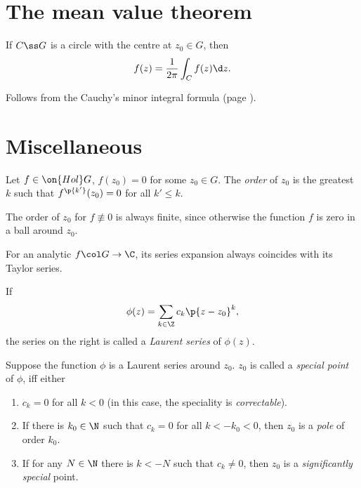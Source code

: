 \documentclass[a4paper, 12pt]{article}
\newcommand{\Hol}[0]{\on{Hol}}
\begin{document}
\section{The mean value theorem}

\begin{lemma}
  If $C \ss G$ is a circle with the centre at $z_0 \in G$, then
  $$ f(z) = \frac{1}{2 \pi} \int_{C} f(z) \d z. $$
\end{lemma}

\begin{idea}
  Follows from the Cauchy's minor integral formula (page \pageref{Cauchy, minor integral formula}).
\end{idea}

\section{Miscellaneous}

\begin{definition}
  Let $f \in \Hol G$, $f(z_0) = 0$ for some $z_0 \in G$. The \emph{order} of $z_0$ is the greatest $k$ such that $f^{\p{k'}}(z_0) = 0$ for all $k' \le k$.
\end{definition}
The order of $z_0$ for $f \not \equiv 0$ is always finite, since otherwise the function $f$ is zero in a ball around $z_0$.

\begin{lemma}
  For an analytic $f \col G \to \C$, its series expansion always coincides with its Taylor series.
\end{lemma}

\begin{definition}
  If
  $$ \phi(z) = \sum_{k \in \Z} c_k \p{z-z_0}^k, $$
  the series on the right is called a \emph{Laurent series} of $\phi(z)$.
\end{definition}

\begin{definition}
    Suppose the function $\phi$ is a Laurent series around $z_0$.
    $z_0$ is called a \emph{special point} of $\phi$, iff either
  \begin{enumerate}
    \item $c_k = 0$ for all $k < 0$ (in this case, the speciality is \emph{correctable}).
    \item If there is $k_0 \in \N$ such that $c_k = 0$ for all $k < -k_0 < 0$, then $z_0$ is a \emph{pole} of order $k_0$.
    \item If for any $N \in \N$ there is $k < -N$ such that $c_k \ne 0$, then $z_0$ is a \emph{significantly special} point. 
  \end{enumerate}
\end{definition}
\end{document}
